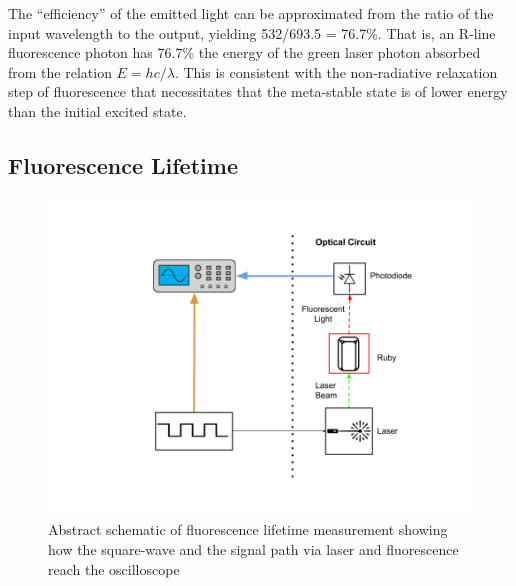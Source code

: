 \documentclass[11pt, a4paper, twocolumn]{article}
\begin{document}
The “efficiency” of the emitted light can be approximated from the ratio of the input wavelength to the output, yielding 532/693.5 = 76.7\%. That is, an R-line fluorescence photon has 76.7\% the energy of the green laser photon absorbed from the relation $E = hc/\lambda$. This is consistent with the non-radiative relaxation step of fluorescence that necessitates that the meta-stable state is of lower energy than the initial excited state.

\subsection*{Fluorescence Lifetime}

\begin{figure}[H]
\includegraphics[width=\linewidth]{decayMeasurementSchematic.png}
\caption{Abstract schematic of fluorescence lifetime measurement showing how the square-wave and the signal path via laser and fluorescence reach the oscilloscope}
\label{fig:intensities}
\end{figure}
\end{document}
